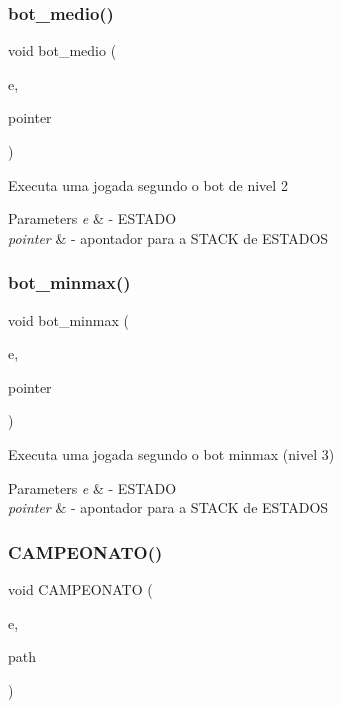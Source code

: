 \subsubsection{bot\_medio()}
{\footnotesize\ttfamily void bot\+\_\+medio (\begin{DoxyParamCaption}\item[{\textbf{ E\+S\+T\+A\+DO} $\ast$}]{e,  }\item[{\textbf{ S\+T\+A\+CK} $\ast$}]{pointer }\end{DoxyParamCaption})}

Executa uma jogada segundo o bot de nivel 2 
\begin{DoxyParams}{Parameters}
{\em e} & -\/ E\+S\+T\+A\+DO \\
\hline
{\em pointer} & -\/ apontador para a S\+T\+A\+CK de E\+S\+T\+A\+D\+OS \\
\hline
\end{DoxyParams}
\mbox{\label{bot_8h_aa15ed208bf5488098023edf0195daa33}} 
\subsubsection{bot\_minmax()}
{\footnotesize\ttfamily void bot\+\_\+minmax (\begin{DoxyParamCaption}\item[{\textbf{ E\+S\+T\+A\+DO} $\ast$}]{e,  }\item[{\textbf{ S\+T\+A\+CK} $\ast$}]{pointer }\end{DoxyParamCaption})}

Executa uma jogada segundo o bot minmax (nivel 3) 
\begin{DoxyParams}{Parameters}
{\em e} & -\/ E\+S\+T\+A\+DO \\
\hline
{\em pointer} & -\/ apontador para a S\+T\+A\+CK de E\+S\+T\+A\+D\+OS \\
\hline
\end{DoxyParams}
\mbox{\label{bot_8h_a93ddad730f0891bb256d9c15f6f76ba0}} 
\subsubsection{CAMPEONATO()}
{\footnotesize\ttfamily void C\+A\+M\+P\+E\+O\+N\+A\+TO (\begin{DoxyParamCaption}\item[{\textbf{ E\+S\+T\+A\+DO} $\ast$}]{e,  }\item[{char $\ast$}]{path }\end{DoxyParamCaption})}


